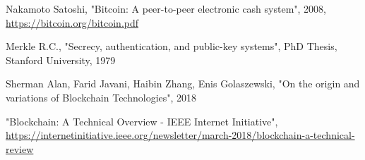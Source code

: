 \documentclass[12pt]{article}
\begin{document}
\begin{thebibliography}{9}

Nakamoto Satoshi,
"Bitcoin: A peer-to-peer electronic cash system",
2008,
\url{https://bitcoin.org/bitcoin.pdf}

Merkle R.C.,
"Secrecy, authentication, and public-key systems",
PhD Thesis,
Stanford University,
1979

Sherman Alan, Farid Javani, Haibin Zhang, Enis Golaszewski,
"On the origin and variations of Blockchain Technologies",
2018

"Blockchain: A Technical Overview - IEEE Internet Initiative",
\url{https://internetinitiative.ieee.org/newsletter/march-2018/blockchain-a-technical-review}
\end{thebibliography}
\end{document}
